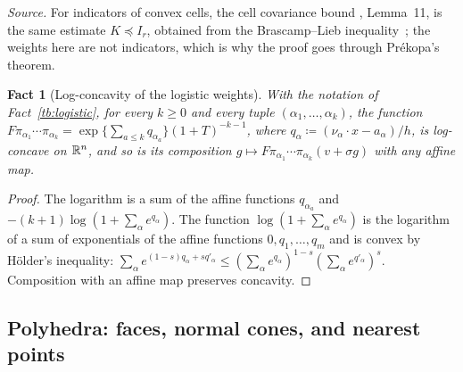 \documentclass[11pt,letterpaper]{article}
\theoremstyle{plain}
\newtheorem{fact}{Fact}[section]
\begin{document}
\emph{Source.} For indicators of convex cells, the cell covariance bound
, Lemma~11, is the same estimate \(K\preceq I_r\), obtained from the
Brascamp--Lieb inequality~; the weights here are not indicators,
which is why the proof goes through Pr\'ekopa's theorem.

\begin{fact}[Log-concavity of the logistic weights]\label{tb:lc-weights}
With the notation of Fact~\ref{tb:logistic}, for every \(k\ge0\) and every
tuple \((\alpha_1,\ldots,\alpha_k)\), the function
\(F\pi_{\alpha_1}\cdots\pi_{\alpha_k}=\exp\{\sum_{a\le k}q_{\alpha_a}\}
(1+T)^{-k-1}\), where \(q_\alpha\coloneqq (\nu_\alpha\cdot x-a_\alpha)/h\), is
log-concave on \(\mathbb R^n\), and so is its composition
\(g\mapsto F\pi_{\alpha_1}\cdots\pi_{\alpha_k}(v+\sigma g)\) with any affine map.
\end{fact}

\begin{proof}
The logarithm is a sum of the affine functions \(q_{\alpha_a}\) and
\(-(k+1)\log(1+\sum_\alpha e^{q_\alpha})\). The function
\(\log(1+\sum_\alpha e^{q_\alpha})\) is the logarithm of a sum of
exponentials of the affine functions \(0,q_1,\ldots,q_m\) and is convex by
H\"older's inequality: \(\sum_\alpha e^{(1-s)q_\alpha+sq'_\alpha}\le
(\sum_\alpha e^{q_\alpha})^{1-s}(\sum_\alpha e^{q'_\alpha})^s\). Composition
with an affine map preserves concavity.
\end{proof}


\subsection{Polyhedra: faces, normal cones, and nearest points}\label{tb:sec:poly}
\end{document}
